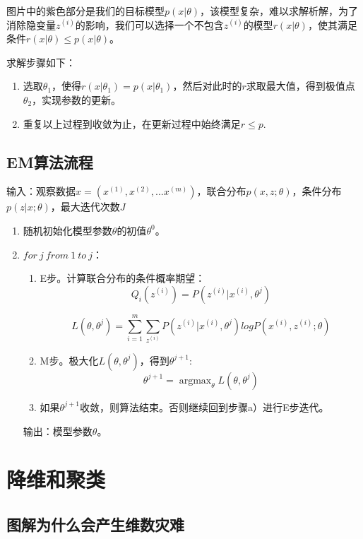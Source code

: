 图片中的紫色部分是我们的目标模型$p(x|\theta)$，该模型复杂，难以求解析解，为了消除隐变量$z^{(i)}$的影响，我们可以选择一个不包含$z^{(i)}$的模型$r(x|\theta)$，使其满足条件$r(x|\theta) \leqslant p(x|\theta) $。

求解步骤如下：

\begin{enumerate}\itemsep0em 
		\item 选取$\theta_1$，使得$r(x|\theta_1) = p(x|\theta_1)$，然后对此时的$r$求取最大值，得到极值点$\theta_2$，实现参数的更新。
		\item 重复以上过程到收敛为止，在更新过程中始终满足$r \leqslant p $.
\end{enumerate}

\subsection{EM算法流程}

输入：观察数据$x=(x^{(1)},x^{(2)},...x^{(m)})$，联合分布$p(x,z ;\theta)$，条件分布$p(z|x; \theta)$，最大迭代次数$J$

\begin{enumerate}\itemsep0em 
		\item 随机初始化模型参数$\theta$的初值$\theta^0$。
		\item $for \ j  \ from \ 1  \ to  \ j$：

		\begin{enumerate}\itemsep0em 
				\item  E步。计算联合分布的条件概率期望：
					$$
				Q_i(z^{(i)}) = P( z^{(i)}|x^{(i)}, \theta^{j})
				$$

				$$
				L(\theta, \theta^{j}) = \sum\limits_{i=1}^m\sum\limits_{z^{(i)}}P( z^{(i)}|x^{(i)}, \theta^{j})log{P(x^{(i)}, z^{(i)};\theta)}
				$$

			\item M步。极大化$L(\theta, \theta^{j})$，得到$\theta^{j+1}$:
				$$
				\theta^{j+1} = \mathop{\arg\max}_\theta L(\theta, \theta^{j})
				$$
			\item 如果$\theta^{j+1}$收敛，则算法结束。否则继续回到步骤a）进行E步迭代。
		\end{enumerate}
		输出：模型参数$\theta$。
\end{enumerate}


\section{降维和聚类}


\subsection{图解为什么会产生维数灾难}

